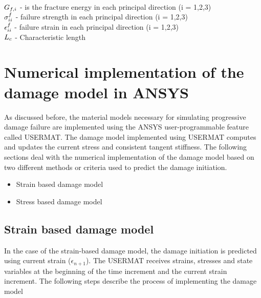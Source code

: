 \documentclass[12pt]{report}
\begin{document}
\\ 
\\ 
\\
$\mathlarger{G_{f,i}}$ \; - \;is the fracture energy in each principal direction (i = 1,2,3)  \\ $\mathlarger{\sigma_{ii}^{f}}$ \;\;\; -  \;  failure strength in each principal direction (i = 1,2,3) \\ $\mathlarger{\epsilon_{ii}^{f}}$\;\;\;\;\; - \; failure strain in each principal direction (i = 1,2,3) \\ $\mathlarger{L_{c}}$\;\;\;\;\; - \; Characteristic length

\section{Numerical implementation of the damage model in ANSYS}
\indent\indent\indent  As discussed before, the material models necessary for simulating progressive damage failure are implemented using the ANSYS user-programmable feature called USERMAT. The damage model implemented using USERMAT computes and updates the current stress and consistent tangent stiffness. The following sections deal with the numerical implementation of the damage model based on two different methods or criteria used to predict the damage initiation.
\\
\begin{itemize}
\item Strain based damage model 
\item Stress based damage model 
\end{itemize}
\subsection{Strain based damage model}
\indent\indent\indent  In the case of the strain-based damage model, the damage initiation is predicted using current strain ($\epsilon_{n+1}$).   The USERMAT receives strains, stresses and state variables at the beginning of the time increment and the current strain increment. The following steps describe the process of implementing the damage model
\end{document}
